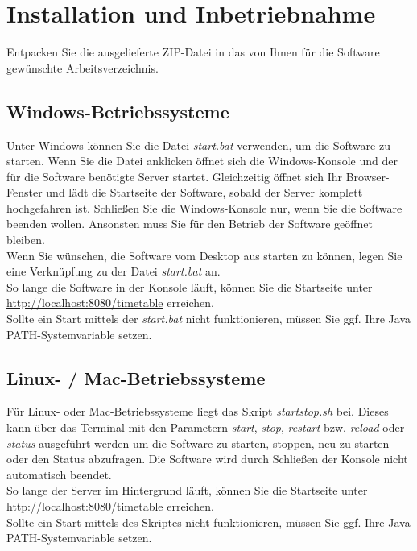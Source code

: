 \documentclass[fontsize=12pt]{scrartcl}
\begin{document}
\section{Installation und Inbetriebnahme}

Entpacken Sie die ausgelieferte ZIP-Datei in das von Ihnen für die Software gewünschte Arbeitsverzeichnis. 

\subsection{Windows-Betriebssysteme}
Unter Windows können Sie die Datei \textit{start.bat} verwenden, um die Software zu starten. Wenn Sie die Datei anklicken öffnet sich die Windows-Konsole und der für die Software benötigte Server startet. Gleichzeitig öffnet sich Ihr Browser-Fenster und lädt die Startseite der Software, sobald der Server komplett hochgefahren ist. Schließen Sie die Windows-Konsole nur, wenn Sie die Software beenden wollen. Ansonsten muss Sie für den Betrieb der Software geöffnet bleiben.\\
Wenn Sie wünschen, die Software vom Desktop aus starten zu können, legen Sie eine Verknüpfung zu der Datei \textit{start.bat} an.\\
So lange die Software in der Konsole läuft, können Sie die Startseite unter \url{http://localhost:8080/timetable} erreichen.\\

Sollte ein Start mittels der \textit{start.bat} nicht funktionieren, müssen Sie ggf. Ihre Java PATH-Systemvariable setzen.

\subsection{Linux- / Mac-Betriebssysteme}
Für Linux- oder Mac-Betriebssysteme liegt das Skript \textit{startstop.sh} bei. Dieses kann über das Terminal mit den Parametern \textit{start}, \textit{stop}, \textit{restart} bzw. \textit{reload} oder \textit{status} ausgeführt werden um die Software zu starten, stoppen, neu zu starten oder den Status abzufragen. Die Software wird durch Schließen der Konsole nicht automatisch beendet.\\
So lange der Server im Hintergrund läuft, können Sie die Startseite unter \url{http://localhost:8080/timetable} erreichen.\\

Sollte ein Start mittels des Skriptes nicht funktionieren, müssen Sie ggf. Ihre Java PATH-Systemvariable setzen.
\end{document}

